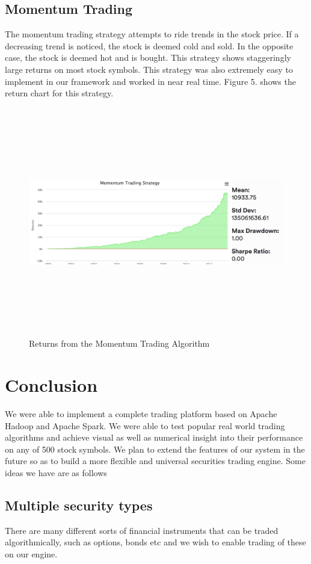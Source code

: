 \documentclass[10pt, conference, compsocconf]{IEEEtran}
\begin{document}
\subsection{Momentum Trading}
The momentum trading strategy attempts to ride trends in the stock price. If a decreasing trend is noticed, the stock is deemed cold and sold. In the opposite case, the stock is deemed hot and is bought. This strategy shows staggeringly large returns on most stock symbols. This strategy was also extremely easy to implement in our framework and worked in near real time. Figure 5. shows the return chart for this strategy.
\begin{figure}
  \includegraphics[width=\textwidth,height=10cm]{Figure5}
  \caption{Returns from the Momentum Trading Algorithm}
\end{figure}


\section{Conclusion}
We were able to implement a complete trading platform based on Apache Hadoop and Apache Spark. We were able to test popular real world trading algorithms and achieve visual as well as numerical insight into their performance on any of 500 stock symbols. We plan to extend the features of our system in the future so as to build a more flexible and universal securities trading engine. Some ideas we have are as follows
\subsection{Multiple security types}
There are many different sorts of financial instruments that can be traded algorithmically, such as options, bonds etc and we wish to enable trading of these on our engine.
\end{document}
